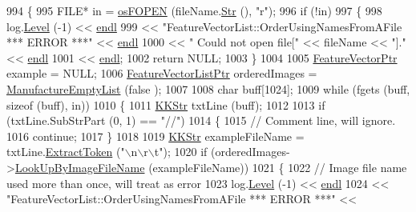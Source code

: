 \begin{DoxyCode}
994 \{
995   FILE*  in = \hyperlink{namespace_k_k_b_abf4050d2916ded8349dafadc80f0ecd1}{osFOPEN} (fileName.\hyperlink{class_k_k_b_1_1_k_k_str_ad574e6c0fe7f6ce1ba3ab0a8ce2fbd52}{Str} (), \textcolor{stringliteral}{"r"});
996   \textcolor{keywordflow}{if}  (!in)
997   \{
998     log.\hyperlink{class_k_k_b_1_1_run_log_a32cf761d7f2e747465fd80533fdbb659}{Level} (-1) << \hyperlink{namespace_k_k_b_ad1f50f65af6adc8fa9e6f62d007818a8}{endl}
999                    << \textcolor{stringliteral}{"FeatureVectorList::OrderUsingNamesFromAFile   *** ERROR ***"} << 
      \hyperlink{namespace_k_k_b_ad1f50f65af6adc8fa9e6f62d007818a8}{endl}
1000                    << \textcolor{stringliteral}{"                               Could not open file["} << fileName << \textcolor{stringliteral}{"]."} << 
      \hyperlink{namespace_k_k_b_ad1f50f65af6adc8fa9e6f62d007818a8}{endl}
1001                    << \hyperlink{namespace_k_k_b_ad1f50f65af6adc8fa9e6f62d007818a8}{endl};
1002     \textcolor{keywordflow}{return} NULL;
1003   \}
1004 
1005   \hyperlink{class_k_k_m_l_l_1_1_feature_vector}{FeatureVectorPtr}      example = NULL;
1006   \hyperlink{class_k_k_m_l_l_1_1_feature_vector_list}{FeatureVectorListPtr}  orderedImages = \hyperlink{class_k_k_m_l_l_1_1_feature_vector_list_af533da1b34e4123f4fcb1343d5f48e37}{ManufactureEmptyList} (\textcolor{keyword}{false}
      );
1007 
1008   \textcolor{keywordtype}{char} buff[1024];
1009   \textcolor{keywordflow}{while}  (fgets (buff, \textcolor{keyword}{sizeof} (buff), in))
1010   \{
1011     \hyperlink{class_k_k_b_1_1_k_k_str}{KKStr}  txtLine (buff);
1012 
1013     \textcolor{keywordflow}{if}  (txtLine.SubStrPart (0, 1) == \textcolor{stringliteral}{"//"})
1014     \{
1015       \textcolor{comment}{// Comment line, will ignore.}
1016       \textcolor{keywordflow}{continue};
1017     \}
1018 
1019     \hyperlink{class_k_k_b_1_1_k_k_str}{KKStr} exampleFileName = txtLine.\hyperlink{class_k_k_b_1_1_k_k_str_acc31c95308d6d699debde883c11e5802}{ExtractToken} (\textcolor{stringliteral}{"\(\backslash\)n\(\backslash\)r\(\backslash\)t"});
1020     \textcolor{keywordflow}{if}  (orderedImages->\hyperlink{class_k_k_m_l_l_1_1_feature_vector_list_a7b336e2b7b9a08db64623f8a7b7c694b}{LookUpByImageFileName} (exampleFileName))
1021     \{
1022       \textcolor{comment}{// Image file name used more than once, will treat as error}
1023       log.\hyperlink{class_k_k_b_1_1_run_log_a32cf761d7f2e747465fd80533fdbb659}{Level} (-1) << \hyperlink{namespace_k_k_b_ad1f50f65af6adc8fa9e6f62d007818a8}{endl}
1024                      << \textcolor{stringliteral}{"FeatureVectorList::OrderUsingNamesFromAFile   *** ERROR ***"} << 

\end{DoxyCode}

